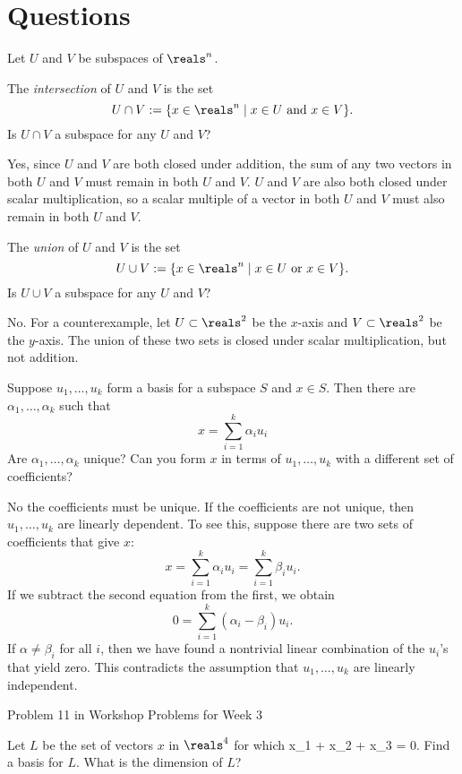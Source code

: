 \documentclass[preprint]{imsart}
\numberwithin{equation}{section}
\numberwithin{equation}{section}
\theoremstyle{plain}
\theoremstyle{remark}
\begin{document}
\section{Questions}

\BNUM
\item Let $U$ and $V$ be subspaces of $\reals^n$. 
\BNUM
\item The \emph{intersection} of $U$ and $V$ is the set 
$$
U\cap V := \{x\in\reals^n\mid x\in U\text{ and }x\in V\}.
$$
Is $U\cap V$ a subspace for any $U$ and $V$? 

Yes, since $U$ and $V$ are both closed under addition, the sum of any two vectors in both $U$ and $V$ must remain in both $U$ and $V$. $U$ and $V$ are also both closed under scalar multiplication, so a scalar multiple of a vector in both $U$ and $V$ must also remain in both $U$ and $V$.

\item The \emph{union} of $U$ and $V$ is the set 
$$
U\cup V := \{x\in\reals^n\mid x\in U\text{ or }x\in V\}.
$$
Is $U\cup V$ a subspace for any $U$ and $V$? 

No. For a counterexample, let $U\subset\reals^2$ be the $x$-axis and $V\subset\reals^2$ be the $y$-axis. The union of these two sets is closed under scalar multiplication, but not addition.
\ENUM

\item Suppose $u_1,\dots,u_k$ form a basis for a subspace $S$ and $x\in S$. Then there are $\alpha_1,\dots,\alpha_k$ such that
$$
x = \sum_{i=1}^k\alpha_iu_i
$$
Are $\alpha_1,\dots,\alpha_k$ unique? Can you form $x$ in terms of $u_1,\dots,u_k$ with a different set of coefficients?

No the coefficients must be unique. If the coefficients are not unique, then $u_1,\dots,u_k$ are linearly dependent. To see this, suppose there are two sets of coefficients that give $x$:
$$
x = \sum_{i=1}^k \alpha_i u_i = \sum_{i=1}^k \beta_i u_i.
$$
If we subtract the second equation from the first, we obtain
$$
0 = \sum_{i = 1}^k (\alpha_i - \beta_i)u_i.
$$
If $\alpha \ne \beta_i$ for all $i$, then we have found a nontrivial linear combination of the $u_i$'s that yield zero. This contradicts the assumption that $u_1,\dots,u_k$ are linearly independent.

\item Problem 11 in Workshop Problems for Week 3 
\BNUM
\item Let $L$ be the set of vectors $x$ in $\reals^4$ for which 
\BEQ
x_1 + x_2 + x_3 = 0.
\label{eq:hyperplane}
\EEQ
Find a basis for $L$. What is the dimension of $L$?
\end{document}

